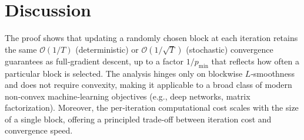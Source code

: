 \documentclass{article}
\begin{document}
\section*{Discussion}
The proof shows that updating a randomly chosen block at each iteration
retains the same $\mathcal O(1/T)$ (deterministic) or $\mathcal O(1/\sqrt{T})$
(stochastic) convergence guarantees as full‑gradient descent, up to a
factor $1/p_{\min}$ that reflects how often a particular block is
selected.  The analysis hinges only on blockwise $L$‑smoothness and does
not require convexity, making it applicable to a broad class of modern
non‑convex machine‑learning objectives (e.g., deep networks, matrix
factorization).  Moreover, the per‑iteration computational cost scales
with the size of a single block, offering a principled trade‑off between
iteration cost and convergence speed.
\end{document}
